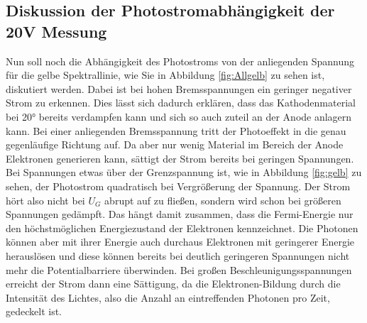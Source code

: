 \subsection{Diskussion der Photostromabhängigkeit der 20V Messung}
Nun soll noch die Abhängigkeit des Photostroms von der anliegenden Spannung 
für die gelbe Spektrallinie, wie Sie in Abbildung \ref{fig:Allgelb} zu sehen ist, diskutiert werden.
Dabei ist bei hohen Bremsspannungen ein geringer negativer Strom zu erkennen.
Dies lässt sich dadurch erklären, dass das Kathodenmaterial bei 20° bereits verdampfen kann und sich so auch zuteil an der Anode anlagern kann.
Bei einer anliegenden Bremsspannung tritt der Photoeffekt in die genau gegenläufige Richtung auf. Da aber nur wenig Material im Bereich der Anode Elektronen generieren kann, sättigt der Strom
bereits bei geringen Spannungen. Bei Spannungen etwas über der Grenzspannung ist, wie in Abbildung \ref{fig:gelb} zu sehen,
der Photostrom quadratisch bei Vergrößerung der Spannung. Der Strom hört also nicht bei $U_G$ abrupt auf zu fließen, sondern wird schon bei größeren Spannungen gedämpft.
Das hängt damit zusammen, dass die Fermi-Energie nur den höchstmöglichen Energiezustand der Elektronen kennzeichnet.
Die Photonen können aber mit ihrer Energie auch durchaus Elektronen mit geringerer Energie herauslösen und diese können bereits bei deutlich geringeren Spannungen nicht mehr die Potentialbarriere 
überwinden. Bei großen Beschleunigungsspannungen erreicht der Strom dann eine Sättigung, da die Elektronen-Bildung durch die Intensität des Lichtes, also die Anzahl an eintreffenden Photonen pro Zeit,
gedeckelt ist. 